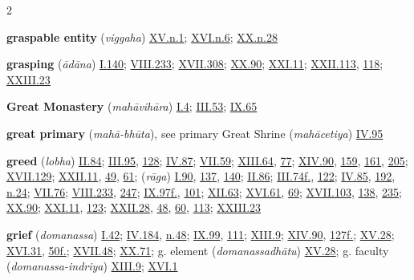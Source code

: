 \begin{multicols}{2}
\begin{vismHanging}
\par\textbf{graspable entity} (\emph{viggaha}) \hyperlink{XV.n1}{XV.n.1}{}; \hyperlink{XVI.n6}{XVI.n.6}{}; \hyperlink{XX.n28}{XX.n.28}{}
\par\textbf{grasping} (\emph{ādāna}) \hyperlink{I.140}{I.140}{}; \hyperlink{VIII.233}{VIII.233}{}; \hyperlink{XVII.308}{XVII.308}{}; \hyperlink{XX.90}{XX.90}{}; \hyperlink{XXI.11}{XXI.11}{}; \hyperlink{XXII.113}{XXII.113}{}, \hyperlink{XXII.118}{118}{}; \hyperlink{XXIII.23}{XXIII.23}{}
\par\textbf{Great Monastery} (\emph{mahāvihāra}) \hyperlink{I.4}{I.4}{}; \hyperlink{III.53}{III.53}{}; \hyperlink{IX.65}{IX.65}{}
\par\textbf{great primary} (\emph{mahā-bhūta}), see primary Great Shrine (\emph{mahācetiya}) \hyperlink{IV.95}{IV.95}{}
\par\textbf{greed} (\emph{lobha}) \hyperlink{II.84}{II.84}{}; \hyperlink{III.95}{III.95}{}, \hyperlink{III.128}{128}{}; \hyperlink{IV.87}{IV.87}{}; \hyperlink{VII.59}{VII.59}{}; \hyperlink{XIII.64}{XIII.64}{}, \hyperlink{XIII.77}{77}{}; \hyperlink{XIV.90}{XIV.90}{}, \hyperlink{XIV.159}{159}{}, \hyperlink{XIV.161}{161}{}, \hyperlink{XIV.205}{205}{}; \hyperlink{XVII.129}{XVII.129}{}; \hyperlink{XXII.11}{XXII.11}{}, \hyperlink{XXII.49}{49}{}, \hyperlink{XXII.61}{61}{}; (\emph{rāga}) \hyperlink{I.90}{I.90}{}, \hyperlink{I.137}{137}{}, \hyperlink{I.140}{140}{}; \hyperlink{II.86}{II.86}{}; \hyperlink{III.74}{III.74f.}{}, \hyperlink{III.122}{122}{}; \hyperlink{IV.85}{IV.85}{}, \hyperlink{IV.192}{192}{}, \hyperlink{IV.n24}{n.24}{}; \hyperlink{VII.76}{VII.76}{}; \hyperlink{VIII.233}{VIII.233}{}, \hyperlink{VIII.247}{247}{}; \hyperlink{IX.97}{IX.97f.}{}, \hyperlink{IX.101}{101}{}; \hyperlink{XII.63}{XII.63}{}; \hyperlink{XVI.61}{XVI.61}{}, \hyperlink{XVI.69}{69}{}; \hyperlink{XVII.103}{XVII.103}{}, \hyperlink{XVII.138}{138}{}, \hyperlink{XVII.235}{235}{}; \hyperlink{XX.90}{XX.90}{}; \hyperlink{XXI.11}{XXI.11}{}, \hyperlink{XXI.123}{123}{}; \hyperlink{XXII.28}{XXII.28}{}, \hyperlink{XXII.48}{48}{}, \hyperlink{XXII.60}{60}{}, \hyperlink{XXII.113}{113}{}; \hyperlink{XXIII.23}{XXIII.23}{}
\par\textbf{grief} (\emph{domanassa}) \hyperlink{I.42}{I.42}{}; \hyperlink{IV.184}{IV.184}{}, \hyperlink{IV.n48}{n.48}{}; \hyperlink{IX.99}{IX.99}{}, \hyperlink{IX.111}{111}{}; \hyperlink{XIII.9}{XIII.9}{}; \hyperlink{XIV.90}{XIV.90}{}, \hyperlink{XIV.127}{127f.}{}; \hyperlink{XV.28}{XV.28}{}; \hyperlink{XVI.31}{XVI.31}{}, \hyperlink{XVI.50}{50f.}{}; \hyperlink{XVII.48}{XVII.48}{}; \hyperlink{XX.71}{XX.71}{}; g. element (\emph{domanassadhātu}) \hyperlink{XV.28}{XV.28}{}; g. faculty (\emph{domanassa-indriya}) \hyperlink{XIII.9}{XIII.9}{}; \hyperlink{XVI.1}{XVI.1}{}

\end{vismHanging}
\end{multicols}
